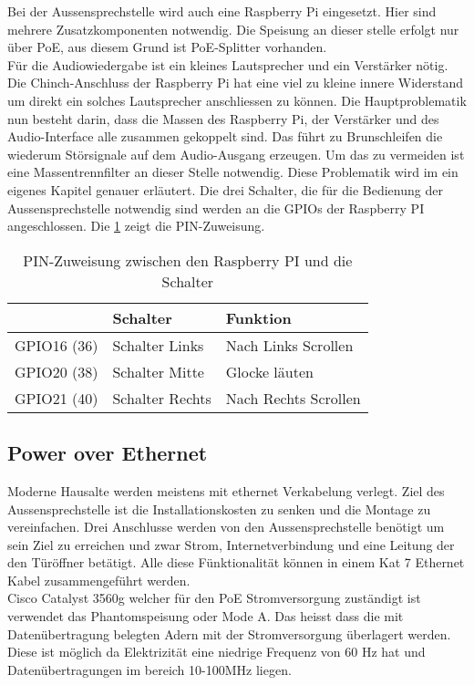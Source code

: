 Bei der Aussensprechstelle wird auch eine Raspberry Pi eingesetzt. Hier sind mehrere Zusatzkomponenten notwendig. Die Speisung an dieser stelle erfolgt nur über PoE, aus diesem Grund ist PoE-Splitter vorhanden.
\\
Für die Audiowiedergabe ist ein kleines Lautsprecher und ein Verstärker nötig. Die Chinch-Anschluss der Raspberry Pi hat eine viel zu kleine innere Widerstand um direkt ein solches Lautsprecher anschliessen zu können. Die Hauptproblematik nun besteht darin, dass die Massen des Raspberry Pi, der Verstärker und des Audio-Interface alle zusammen gekoppelt sind. Das führt zu Brunschleifen die wiederum Störsignale auf dem Audio-Ausgang erzeugen. Um das zu vermeiden ist eine Massentrennfilter an dieser Stelle notwendig. Diese Problematik wird im ein eigenes Kapitel genauer erläutert.
Die drei Schalter, die für die Bedienung der Aussensprechstelle notwendig sind werden an die GPIOs der Raspberry PI angeschlossen. Die \cref{tbl:pinroutesdoor} zeigt die PIN-Zuweisung.
\begin{table}[]
	\centering
	\label{my-label}
	\begin{tabular}{l|ll}
		\multicolumn{1}{r|}{} \textbf{Pi GPIO (PIN)} & \textbf{Schalter} & \textbf{Funktion} \hspace{60pt}	\\ \hline
		GPIO16 (36)	&	Schalter Links		&	Nach Links Scrollen	\\ \hline
		GPIO20 (38)	&	Schalter Mitte		&	Glocke läuten		\\ \hline
		GPIO21 (40)	&	Schalter Rechts		&	Nach Rechts Scrollen		\\ \hline
	\end{tabular}
	\caption{PIN-Zuweisung zwischen den Raspberry PI und die Schalter}
	\label{tbl:pinroutesdoor}
\end{table}


\subsection{Power over Ethernet}
\label{sec:poe}
Moderne Hausalte werden meistens mit ethernet Verkabelung verlegt. Ziel des Aussensprechstelle ist die Installationskosten zu senken und die Montage zu vereinfachen. Drei Anschlusse werden von den Aussensprechstelle benötigt um sein Ziel zu erreichen und zwar Strom, Internetverbindung und eine Leitung der den Türöffner betätigt. Alle diese Fünktionalität können in einem Kat 7 Ethernet Kabel zusammengeführt werden. 
\\
Cisco Catalyst 3560g welcher für den PoE Stromversorgung zuständigt ist verwendet das Phantomspeisung oder Mode A. Das heisst dass die mit Datenübertragung belegten Adern mit der Stromversorgung überlagert werden. Diese ist möglich da Elektrizität eine niedrige Frequenz von 60 Hz hat und Datenübertragungen im bereich 10-100MHz liegen.

